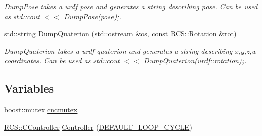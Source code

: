 \begin{DoxyCompactItemize}
\begin{DoxyCompactList}\small\item\em Dump\-Pose takes a urdf pose and generates a string describing pose. Can be used as std\-::cout $<$$<$ Dump\-Pose(pose);. \end{DoxyCompactList}\item 
std\-::string \hyperlink{namespaceRCS_a994378d2744371f1afac4b59a808fef2}{Dump\-Quaterion} (std\-::ostream \&os, const \hyperlink{namespaceRCS_a3fd915276fdb632d217c560523c320e0}{R\-C\-S\-::\-Rotation} \&rot)
\begin{DoxyCompactList}\small\item\em Dump\-Quaterion takes a urdf quaterion and generates a string describing x,y,z,w coordinates. Can be used as std\-::cout $<$$<$ Dump\-Quaterion(urdf\-::rotation);. \end{DoxyCompactList}\end{DoxyCompactItemize}
\subsection*{Variables}
\begin{DoxyCompactItemize}
\item 
boost\-::mutex \hyperlink{namespaceRCS_a021572a9d03c82d96029e82ea5691d60}{cncmutex}
\item 
\hyperlink{structRCS_1_1CController}{R\-C\-S\-::\-C\-Controller} \hyperlink{namespaceRCS_a9d517dc59f249be605546c3a36086b19}{Controller} (\hyperlink{RCS_8h_a226eb3a426e9df46b88c4ba34f217203}{D\-E\-F\-A\-U\-L\-T\-\_\-\-L\-O\-O\-P\-\_\-\-C\-Y\-C\-L\-E})
\end{DoxyCompactItemize}


